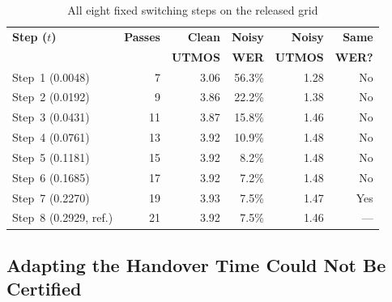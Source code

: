 \begin{table}[!htbp]
\centering\small
\caption{All eight fixed switching steps on the released grid}
\label{tab:fixed-steps}
\setlength{\tabcolsep}{5pt}
\begin{tabular}{@{}l r r r r r@{}}
\toprule
\textbf{Step ($t$)} & \textbf{Passes} & \textbf{Clean} & \textbf{Noisy} & \textbf{Noisy} & \textbf{Same} \\
 & & \textbf{UTMOS} & \textbf{WER} & \textbf{UTMOS} & \textbf{WER?} \\
\midrule
Step~1 (0.0048) & 7 & 3.06 & 56.3\% & 1.28 & No \\
Step~2 (0.0192) & 9 & 3.86 & 22.2\% & 1.38 & No \\
Step~3 (0.0431) & 11 & 3.87 & 15.8\% & 1.46 & No \\
Step~4 (0.0761) & 13 & 3.92 & 10.9\% & 1.48 & No \\
Step~5 (0.1181) & 15 & 3.92 & 8.2\% & 1.48 & No \\
Step~6 (0.1685) & 17 & 3.92 & 7.2\% & 1.48 & No \\
Step~7 (0.2270) & 19 & 3.93 & 7.5\% & 1.47 & Yes \\
Step~8 (0.2929, ref.) & 21 & 3.92 & 7.5\% & 1.46 & --- \\
\bottomrule
\end{tabular}
\par{}
\end{table}

\subsection{Adapting the Handover Time Could Not Be Certified}
\label{app:prelim-timing}


